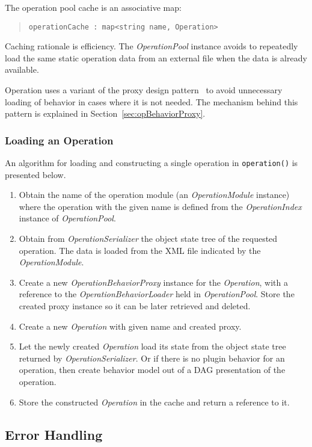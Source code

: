 \documentclass[a4paper,twoside]{tce}
\begin{document}
The operation pool cache is an associative map:
\begin{quote}
\verb|operationCache : map<string name, Operation>|
\end{quote}
Caching rationale is efficiency.  The \emph{OperationPool} instance avoids
to repeatedly load the same static operation data from an external file when
the data is already available.

Operation uses a variant of the proxy design pattern~\cite{DesignPatterns}
to avoid unnecessary loading of behavior in cases where it is not
needed. The mechanism behind this pattern is explained in
Section~\ref{sec:opBehaviorProxy}.

\subsubsection{Loading an Operation}

An algorithm for loading and constructing a single operation in
\verb|operation()| is presented below.

\begin{enumerate}
\item %
  Obtain the name of the operation module (an \emph{OperationModule}
  instance) where the operation with the given name is defined from the
  \emph{OperationIndex} instance of \emph{OperationPool}.
\item %
  Obtain from \emph{OperationSerializer} the object state tree of the
  requested operation.  The data is loaded from the XML file indicated by
  the \emph{OperationModule}.
\item %
  Create a new \emph{OperationBehaviorProxy} instance for the
  \emph{Operation}, with a reference to the \emph{OperationBehaviorLoader}
  held in \emph{OperationPool}.  Store the created proxy instance so it can
  be later retrieved and deleted.
\item %
  Create a new \emph{Operation} with given name and created proxy.
\item %
  Let the newly created \emph{Operation} load its state from the object
  state tree returned by \emph{OperationSerializer}. Or if there is no 
  plugin behavior for an operation, then create behavior model out of 
  a DAG presentation of the operation.
\item %
  Store the constructed \emph{Operation} in the cache and return a reference
  to it.
\end{enumerate}

\subsection{Error Handling}
\end{document}
